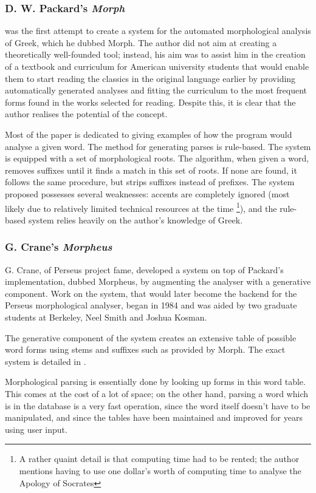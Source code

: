 \subsubsection{D. W. Packard's \textit{Morph}}
\cite{packard1973computer} was the first attempt to create a system
for the automated morphological analysis of Greek, which he dubbed
Morph. The author did not aim at creating a theoretically well-founded
tool; instead, his aim was to assist him in the creation of a textbook
and curriculum for American university students that would enable them
to start reading the classics in the original language earlier by
providing automatically generated analyses and fitting the curriculum
to the most frequent forms found in the works selected for
reading. Despite this, it is clear that the author realises the
potential of the concept.

Most of the paper is dedicated to giving examples of how the program
would analyse a given word. The method for generating parses is
rule-based. The system is equipped with a set of morphological roots.
The algorithm, when given a word, removes suffixes until it finds a
match in this set of roots. If none are found, it follows the same
procedure, but strips suffixes instead of prefixes. The system
proposed possesses several weaknesses: accents are completely ignored
(most likely due to relatively limited technical resources at the time
\footnote{A rather quaint detail is that computing time had to be
rented; the author mentions having to use one dollar's worth of
computing time to analyse the Apology of Socrates}), and the rule-based
system relies heavily on the author's knowledge of Greek.

\subsubsection{G. Crane's \textit{Morpheus}}
G. Crane, of Perseus project fame, developed a system on top of
Packard's implementation, dubbed Morpheus, by augmenting the analyser
with a generative component. Work on the system, that would later
become the backend for the Perseus morphological analyser, began in
1984 and was aided by two graduate students at Berkeley, Neel Smith
and Joshua Kosman.

The generative component of the system creates an extensive table of
possible word forms using stems and suffixes such as provided by
Morph. The exact system is detailed in \cite{crane1991generating}.

Morphological parsing is essentially done by looking up forms in this
word table. This comes at the cost of a lot of space; on the other
hand, parsing a word which is in the database is a very fast
operation, since the word itself doesn't have to be manipulated, and
since the tables have been maintained and improved for years using
user input.

